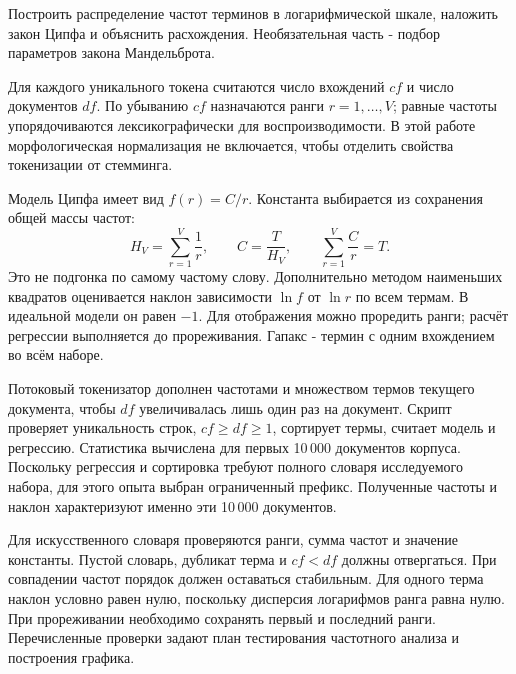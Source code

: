 \task
Построить распределение частот терминов в логарифмической шкале,
наложить закон Ципфа и объяснить расхождения. Необязательная часть -
подбор параметров закона Мандельброта.

\method
Для каждого уникального токена считаются число вхождений \(cf\) и число
документов \(df\). По убыванию \(cf\) назначаются ранги \(r=1,\ldots,V\);
равные частоты упорядочиваются лексикографически для воспроизводимости.
В этой работе морфологическая нормализация не включается, чтобы
отделить свойства токенизации от стемминга.

Модель Ципфа имеет вид \(f(r)=C/r\). Константа выбирается из сохранения
общей массы частот:
\[
H_V=\sum_{r=1}^{V}\frac1r,\qquad C=\frac{T}{H_V},
\qquad\sum_{r=1}^{V}\frac{C}{r}=T.
\]
Это не подгонка по самому частому слову. Дополнительно методом наименьших
квадратов оценивается наклон зависимости \(\ln f\) от \(\ln r\)
по всем термам. В идеальной модели он равен \(-1\).
Для отображения можно проредить ранги; расчёт регрессии выполняется
до прореживания. Гапакс - термин с одним вхождением во всём наборе.

\journal
Потоковый токенизатор дополнен частотами и множеством термов текущего
документа, чтобы \(df\) увеличивалась лишь один раз на документ.
Скрипт  проверяет уникальность строк,
\(cf\ge df\ge1\), сортирует термы, считает модель и регрессию.
Статистика вычислена для первых 10\,000 документов
корпуса. Поскольку регрессия и сортировка требуют полного словаря
исследуемого набора, для этого опыта выбран ограниченный префикс.
Полученные частоты и наклон характеризуют именно эти 10\,000 документов.

\testing
Для искусственного словаря проверяются ранги, сумма частот и значение
константы. Пустой словарь, дубликат терма и \(cf<df\) должны отвергаться.
При совпадении частот порядок должен оставаться стабильным. Для
одного терма наклон условно равен нулю, поскольку дисперсия логарифмов
ранга равна нулю. При прореживании необходимо сохранять первый и
последний ранги. Перечисленные проверки задают план тестирования
частотного анализа и построения графика.

